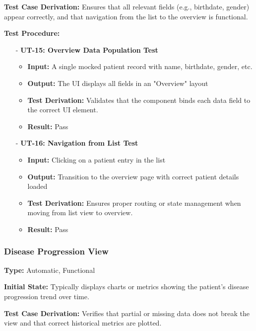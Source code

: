 \documentclass[12pt, titlepage]{article}
\begin{document}
\noindent \textbf{Test Case Derivation:}
Ensures that all relevant fields (e.g., birthdate, gender) appear correctly, and that navigation from the list to the overview is functional.
\vspace{10pt}

\noindent \textbf{Test Procedure:}
\begin{itemize}
   \item[-] \textbf{UT-15: Overview Data Population Test} \label{test:patient-overview-data}
   \begin{itemize}
     \item \textbf{Input:} A single mocked patient record with name, birthdate, gender, etc.
     \item \textbf{Output:} The UI displays all fields in an "Overview" layout
     \item \textbf{Test Derivation:} Validates that the component binds each data field to the correct UI element.
     \item \textbf{Result:} Pass
   \end{itemize}

   \item[-] \textbf{UT-16: Navigation from List Test} \label{test:patient-overview-nav}
   \begin{itemize}
     \item \textbf{Input:} Clicking on a patient entry in the list
     \item \textbf{Output:} Transition to the overview page with correct patient details loaded
     \item \textbf{Test Derivation:} Ensures proper routing or state management when moving from list view to overview.
     \item \textbf{Result:} Pass
   \end{itemize}
\end{itemize}
\vspace{10pt}


\subsubsection{Disease Progression View}
\textbf{Type:} Automatic, Functional
\vspace{10pt}

\noindent \textbf{Initial State:}
Typically displays charts or metrics showing the patient's disease progression trend over time.
\vspace{10pt}

\noindent \textbf{Test Case Derivation:}
Verifies that partial or missing data does not break the view and that correct historical metrics are plotted.
\vspace{10pt}
\end{document}
